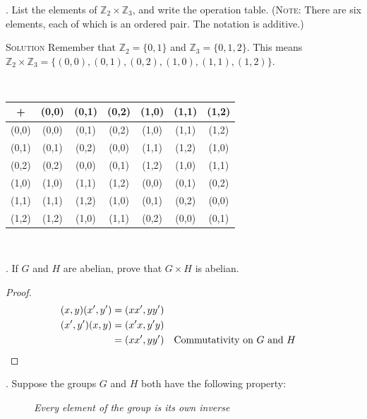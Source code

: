 \documentclass[twoside]{amsart}
\newcommand{\Solution}{\textsc{Solution}\xspace}
\begin{document}
\begin{enumerate}[A.]
\begin{enumerate}[(a)]
      . List the elements of $\mathbb{Z}_2 \times \mathbb{Z}_3$,
      and write the operation table. (\textsc{Note}: There are six
      elements, each of which is an ordered pair. The notation is additive.)
      
      \Solution Remember that $\mathbb{Z}_2 = \{0,1\}$ and $\mathbb{Z}_3 =
      \{0,1,2\}$. This means $\mathbb{Z}_2 \times \mathbb{Z}_3 =
      \{(0,0), (0,1), (0,2), (1,0), (1,1), (1,2)\}$.

      \tiny \begin{verbatim}
      
      \end{verbatim}\normalsize
      \begin{center}
      \begin{tabular}{c|cccccc}
        +   & (0,0) & (0,1) & (0,2) & (1,0) & (1,1) & (1,2) \\ \hline
      (0,0) & (0,0) & (0,1) & (0,2) & (1,0) & (1,1) & (1,2) \\
      (0,1) & (0,1) & (0,2) & (0,0) & (1,1) & (1,2) & (1,0) \\
      (0,2) & (0,2) & (0,0) & (0,1) & (1,2) & (1,0) & (1,1) \\
      (1,0) & (1,0) & (1,1) & (1,2) & (0,0) & (0,1) & (0,2) \\
      (1,1) & (1,1) & (1,2) & (1,0) & (0,1) & (0,2) & (0,0) \\
      (1,2) & (1,2) & (1,0) & (1,1) & (0,2) & (0,0) & (0,1) 
      \end{tabular}
      \end{center}
      \tiny \begin{verbatim}
      
      \end{verbatim}\normalsize

      . If $G$ and $H$ are abelian, prove that $G \times H$
      is abelian.

      \begin{proof}
      \begin{align*}
         (x,y)(x',y') & = (xx',yy') \\
	 (x',y')(x,y) & = (x'x,y'y) \\
	              & = (xx',yy') && \text{Commutativity on $G$ and $H$}
		      \qedhere
      \end{align*}
      \end{proof}

      . Suppose the groups $G$ and $H$ both have the following
      property:
      \begin{figure}[ht]
          \emph{Every element of the group is its own inverse}
      \end{figure}


\end{enumerate}
\end{enumerate}
\end{document}
